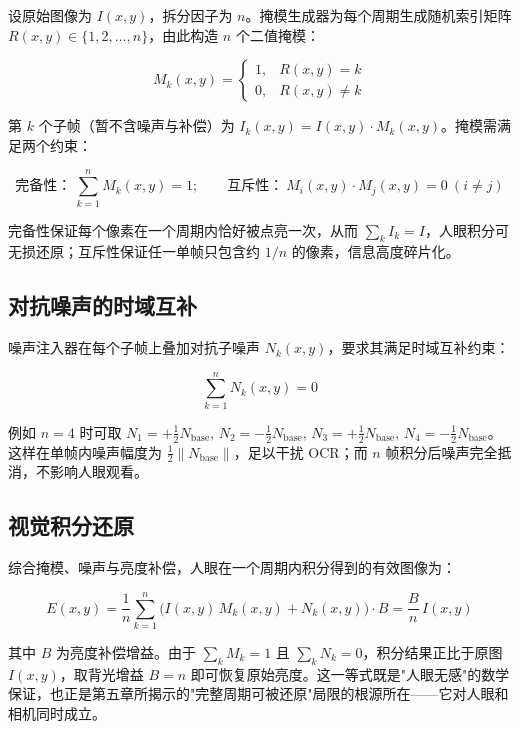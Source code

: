 设原始图像为 $I(x,y)$，拆分因子为 $n$。掩模生成器为每个周期生成随机索引矩阵 $R(x,y) \in \{1,2,\dots,n\}$，由此构造 $n$ 个二值掩模：

\begin{equation}
M_k(x,y) =
\begin{cases}
1, & R(x,y) = k \\
0, & R(x,y) \ne k
\end{cases}
\end{equation}

第 $k$ 个子帧（暂不含噪声与补偿）为 $I_k(x,y) = I(x,y) \cdot M_k(x,y)$。掩模需满足两个约束：

\begin{equation}
\text{完备性：}\ \sum_{k=1}^{n} M_k(x,y) = 1; \qquad
\text{互斥性：}\ M_i(x,y) \cdot M_j(x,y) = 0\ (i \ne j)
\end{equation}

完备性保证每个像素在一个周期内恰好被点亮一次，从而 $\sum_k I_k = I$，人眼积分可无损还原；互斥性保证任一单帧只包含约 $1/n$ 的像素，信息高度碎片化。

\subsection{对抗噪声的时域互补}

噪声注入器在每个子帧上叠加对抗子噪声 $N_k(x,y)$，要求其满足时域互补约束：

\begin{equation}
\sum_{k=1}^{n} N_k(x,y) = 0
\end{equation}

例如 $n=4$ 时可取 $N_1=+\tfrac{1}{2}N_{\text{base}},\,N_2=-\tfrac{1}{2}N_{\text{base}},\,N_3=+\tfrac{1}{2}N_{\text{base}},\,N_4=-\tfrac{1}{2}N_{\text{base}}$。这样在单帧内噪声幅度为 $\tfrac{1}{2}\|N_{\text{base}}\|$，足以干扰 OCR；而 $n$ 帧积分后噪声完全抵消，不影响人眼观看。

\subsection{视觉积分还原}

综合掩模、噪声与亮度补偿，人眼在一个周期内积分得到的有效图像为：

\begin{equation}
E(x,y) = \frac{1}{n}\sum_{k=1}^{n}\big(I(x,y)\,M_k(x,y) + N_k(x,y)\big)\cdot B
= \frac{B}{n}\,I(x,y)
\end{equation}

其中 $B$ 为亮度补偿增益。由于 $\sum_k M_k = 1$ 且 $\sum_k N_k = 0$，积分结果正比于原图 $I(x,y)$，取背光增益 $B=n$ 即可恢复原始亮度。这一等式既是"人眼无感"的数学保证，也正是第五章所揭示的"完整周期可被还原"局限的根源所在——它对人眼和相机同时成立。

